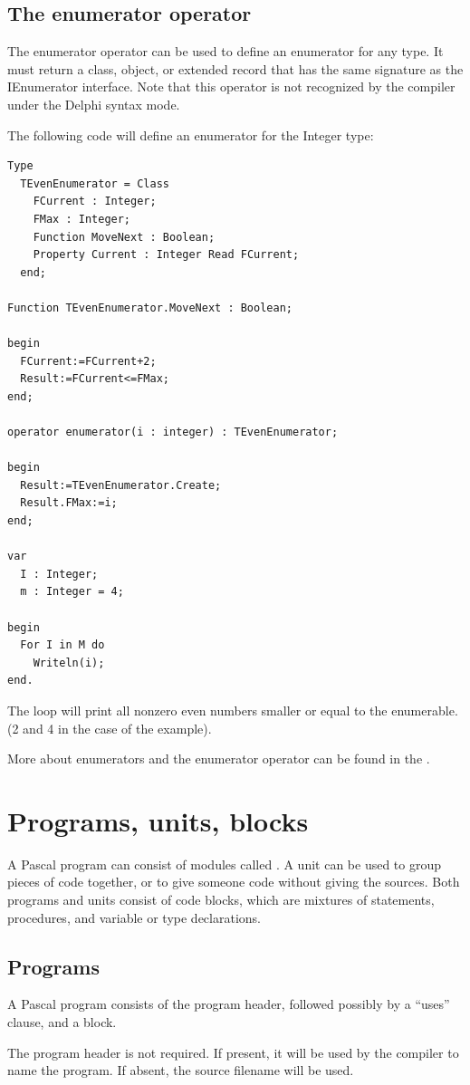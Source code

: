 \section{The enumerator operator}
The enumerator operator can be used to define an enumerator for any type.
It must return a class, object, or extended record that has the same signature as the IEnumerator interface.
Note that this operator is not recognized by the compiler under the Delphi syntax mode.

The following code will define an enumerator for the Integer type:
\begin{verbatim}
Type
  TEvenEnumerator = Class
    FCurrent : Integer;
    FMax : Integer;
    Function MoveNext : Boolean;
    Property Current : Integer Read FCurrent;
  end;

Function TEvenEnumerator.MoveNext : Boolean;

begin
  FCurrent:=FCurrent+2;
  Result:=FCurrent<=FMax;
end;

operator enumerator(i : integer) : TEvenEnumerator;

begin
  Result:=TEvenEnumerator.Create;
  Result.FMax:=i;
end;

var
  I : Integer;
  m : Integer = 4;

begin
  For I in M do
    Writeln(i);
end.
\end{verbatim}

The loop will print all nonzero even numbers smaller or equal to the enumerable. (2 and 4 in the case of the example).

More about enumerators and the enumerator operator can be found in the
.


\chapter{Programs, units, blocks}
A Pascal program can consist of modules called . A unit can be used
to group pieces of code together, or to give someone code without giving
the sources.
Both programs and units consist of code blocks, which are mixtures of
statements, procedures, and variable or type declarations.

\section{Programs}
A Pascal program consists of the program header, followed possibly by a
``uses'' clause, and a block.

The program header is not required. If present, it will be used by the compiler
to name the program. If absent, the source filename will be used. 

